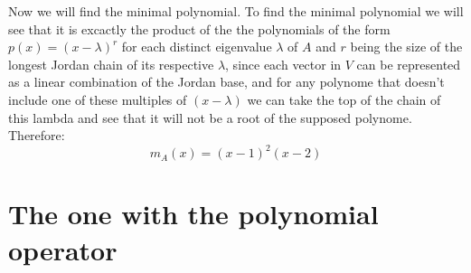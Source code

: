 \documentclass[11pt,a4paper]{article}
\theoremstyle{plain}
\begin{document}
	Now we will find the minimal polynomial. To find the minimal polynomial
	we will see that it is excactly the product of the the polynomials
	of the form $p(x)=(x-\lambda)^r$ for each distinct eigenvalue $\lambda$
	of $A$ and $r$ being the size of the longest Jordan chain of its
	respective $\lambda$, since each vector in $V$ can be represented as a 
	linear combination of the Jordan base, and for any polynome that doesn't 
	include one of these multiples of $(x-\lambda)$ we can take the top of
	the chain of this lambda and see that it will not be a root of the supposed
	polynome. Therefore:
	\[
		m_A(x) = (x-1)^2 (x-2)
	\]

	\newpage
	
	\section{The one with the polynomial operator}
\end{document}
